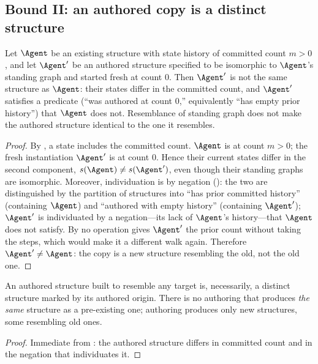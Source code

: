 \subsection{Bound II: an authored copy is a distinct structure}

\begin{theorem}
\label{thm:nondup}
Let $\Agent$ be an existing structure with state history of committed count $m>0$,
and let $\Agent'$ be an authored structure specified to be isomorphic to
$\Agent$'s standing graph and started fresh at count $0$. Then $\Agent'$ is not
the same structure as $\Agent$: their states differ in the committed count, and
$\Agent'$ satisfies a predicate \textup{(}``was authored at count $0$,'' equivalently
``has empty prior history''\textup{)} that $\Agent$ does not. Resemblance of
standing graph does not make the authored structure identical to the one it
resembles.
\end{theorem}

\begin{proof}
By , a state includes the committed count. $\Agent$ is at count
$m>0$; the fresh instantiation $\Agent'$ is at count $0$. Hence their current
states differ in the second component, $s(\Agent)\neq s(\Agent')$, even though
their standing graphs are isomorphic. Moreover, individuation is by negation
(): the two are distinguished by the partition of structures
into ``has prior committed history'' (containing $\Agent$) and ``authored with
empty history'' (containing $\Agent'$); $\Agent'$ is individuated by a
negation---its lack of $\Agent$'s history---that $\Agent$ does not satisfy. By
 no operation gives $\Agent'$ the prior count without taking
the steps, which would make it a different walk again. Therefore $\Agent'\neq
\Agent$: the copy is a new structure resembling the old, not the old one.
\end{proof}

\begin{corollary}
\label{cor:new-individual}
An authored structure built to resemble any target is, necessarily, a distinct
structure marked by its authored origin. There is no authoring that produces
\emph{the same} structure as a pre-existing one; authoring produces only new
structures, some resembling old ones.
\end{corollary}

\begin{proof}
Immediate from : the authored structure differs in committed
count and in the negation that individuates it.
\end{proof}

